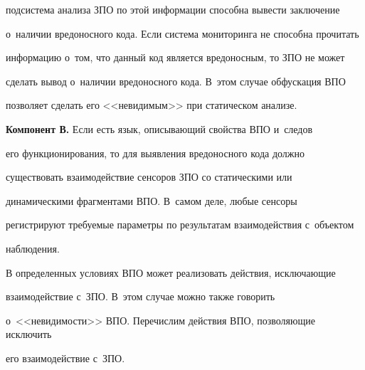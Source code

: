 подсистема анализа ЗПО по этой информации способна вывести заключение 


о~наличии вредоносного кода. Если система мониторинга не способна прочитать 


информацию о~том, что данный код является вредоносным, то ЗПО не может 


сделать вывод о~наличии вредоносного кода. В~этом случае обфускация ВПО 


позволяет сделать его <<невидимым>> при статическом анализе. 


  


  \textbf{Компонент В.} Если есть язык, описывающий свойства ВПО и~следов 


его функционирования, то для выявления вредоносного кода должно 


существовать взаимодействие сенсоров ЗПО со статическими или 


динамическими фрагментами ВПО. В~самом деле, любые сенсоры 


регистрируют требуемые параметры по результатам взаимодействия с~объектом 


наблюдения. 


  


  В определенных условиях ВПО может реализовать действия, исключающие 


взаимодействие с~ЗПО. В~этом случае можно также говорить 


о~<<невидимости>> ВПО. Перечислим действия ВПО, позволяющие исключить 


его взаимодействие с~ЗПО. 


